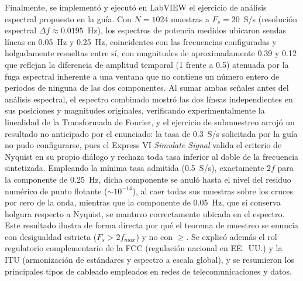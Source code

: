 \documentclass[conference]{IEEEtran}
\begin{document}
Finalmente, se implementó y ejecutó en LabVIEW el ejercicio de análisis espectral propuesto en la guía. Con $N=1024$ muestras a $F_s=20$~S/s (resolución espectral $\Delta f\approx0.0195$~Hz), los espectros de potencia medidos ubicaron sendas líneas en 0.05~Hz y 0.25~Hz, coincidentes con las frecuencias configuradas y holgadamente resueltas entre sí, con magnitudes de aproximadamente 0.39 y 0.12 que reflejan la diferencia de amplitud temporal (1 frente a 0.5) atenuada por la fuga espectral inherente a una ventana que no contiene un número entero de periodos de ninguna de las dos componentes. Al sumar ambas señales antes del análisis espectral, el espectro combinado mostró las dos líneas independientes en sus posiciones y magnitudes originales, verificando experimentalmente la linealidad de la Transformada de Fourier, y el ejercicio de submuestreo arrojó un resultado no anticipado por el enunciado: la tasa de 0.3~S/s solicitada por la guía no pudo configurarse, pues el Express VI \textit{Simulate Signal} valida el criterio de Nyquist en su propio diálogo y rechaza toda tasa inferior al doble de la frecuencia sintetizada. Empleando la mínima tasa admitida (0.5~S/s), exactamente $2f$ para la componente de 0.25~Hz, dicha componente se anuló hasta el nivel del residuo numérico de punto flotante ($\sim10^{-14}$), al caer todas sus muestras sobre los cruces por cero de la onda, mientras que la componente de 0.05~Hz, que sí conserva holgura respecto a Nyquist, se mantuvo correctamente ubicada en el espectro. Este resultado ilustra de forma directa por qué el teorema de muestreo se enuncia con desigualdad estricta ($F_s>2f_{max}$) y no con $\geq$. Se explicó además el rol regulatorio complementario de la FCC (regulación nacional en EE.~UU.) y la ITU (armonización de estándares y espectro a escala global), y se resumieron los principales tipos de cableado empleados en redes de telecomunicaciones y datos.



\end{document}
